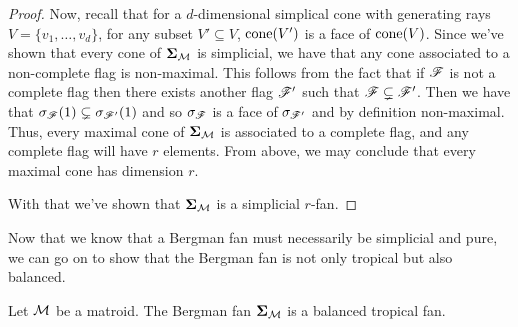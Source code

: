 \documentclass[12pt,oneside]{../../sfsuthesis}
\begin{document}
\begin{proof}
    Now, recall that for a \( d \)-dimensional simplical cone with generating rays \(  V = \{ v_1, \dots, v_d \} \), for any subset \( V' \subseteq V \),
    \( \mathrm{cone}(V') \) is a face of \( \mathrm{cone}(V) \).
    Since we've  shown that every cone of \( \bm{\Sigma}_{\mathcal{M}} \) is simplicial, we have that any cone associated to a non-complete flag is non-maximal.
    This follows from the fact that if \( \mathscr{F} \) is not a complete flag then there exists another flag \( \mathscr{F}' \) such that \( \mathscr{F} \subsetneq \mathscr{F}' \).
    Then we have that \( \sigma_{\mathscr{F}}(1) \subsetneq \sigma_{\mathscr{F}'}(1) \) and so \( \sigma_{\mathscr{F}} \) is a face of \( \sigma_{\mathscr{F}'} \) and by definition non-maximal.
    Thus, every maximal cone of \( \bm{\Sigma}_{\mathcal{M}} \) is associated to a complete flag, and any complete flag will have \( r \) elements.
    From above, we may conclude that every maximal cone has dimension \( r \).

    With that we've shown that \( \bm{\Sigma}_{\mathcal{M}} \) is a simplicial \( r \)-fan.

\end{proof}
Now that we know that a Bergman fan must necessarily be simplicial and pure, we can go on to show that the Bergman fan is not only tropical but also balanced.
\begin{proposition}
    Let \( \mathcal{M} \) be a matroid.
    The Bergman fan \( \bm{\Sigma}_{\mathcal{M}} \) is a balanced tropical fan.
\end{proposition}
\end{document}

